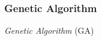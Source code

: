 %
%
%
%
%
%
%

\subsubsection{Genetic Algorithm}
\label{genetic_algorithm_heading}

\emph{Genetic Algorithm} (GA)
